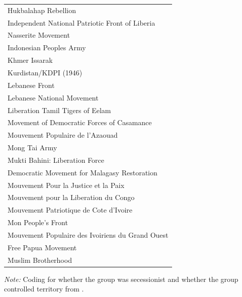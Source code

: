 \documentclass[12pt, letterpaper]{article}
\begin{document}
\begin{center}
\begin{table}[htbp]
\begin{tabular}{l}
Hukbalahap Rebellion \\
Independent National Patriotic Front of Liberia \\
Nasserite Movement \\
Indonesian Peoples Army \\
Khmer Issarak \\
Kurdistan/KDPI (1946) \\
Lebanese Front \\
Lebanese National Movement \\
Liberation Tamil Tigers of Eelam \\
Movement of Democratic Forces of Casamance \\
Mouvement Populaire de l'Azaouad \\
Mong Tai Army \\
Mukti Bahini: Liberation Force \\
Democratic Movement for Malagasy Restoration \\
Mouvement Pour la Justice et la Paix \\
Mouvement pour la Liberation du Congo \\
Mouvement Patriotique de Cote d'Ivoire \\
Mon People's Front \\
Mouvement Populaire des Ivoiriens du Grand Ouest \\
Free Papua Movement \\
Muslim Brotherhood \\
\hline
\hline
\end{tabular}
\begin{tablenotes}
\raggedright \footnotesize{\textit{Note:} Coding for whether the group was secessionist and whether the group controlled territory from \citep{cunningham2009takes}.} 
\end{tablenotes}
\end{table}


\end{center}
\end{document}
